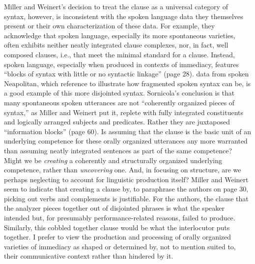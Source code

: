 Miller and Weinert’s decision to treat the clause as a universal category of syntax, however, is inconsistent with the spoken language data they themselves present or their own characterization of these data. For example, they acknowledge that spoken language, especially its more spontaneous varieties, often exhibits neither neatly integrated clause complexes, nor, in fact, well composed clauses, i.e., that meet the minimal standard for a clause. Instead, spoken language, especially when produced in contexts of immediacy, features “blocks of syntax with little or no syntactic linkage” (page 28).  data from spoken Neapolitan, which \citet{MillerWeinert1998} reference to illustrate how fragmented spoken syntax can be, is a good example of this more disjointed syntax. Sornicola’s conclusion is that many spontaneous spoken utterances are not “coherently organized pieces of syntax,” as Miller and Weinert put it, replete with fully integrated constituents and logically arranged subjects and predicates. Rather they are juxtaposed “information blocks” (page 60). Is assuming that the clause is the basic unit of an underlying competence for these orally organized utterances any more warranted than assuming neatly integrated sentences as part of the same competence? Might we be \textit{creating} a coherently and structurally organized underlying competence, rather than \textit{uncovering} one. And, in focusing on structure, are we perhaps neglecting to account for linguistic production itself? Miller and Weinert seem to indicate that creating a clause by, to paraphrase the authors on page 30, picking out verbs and complements is justifiable. For the authors, the clause that the analyzer pieces together out of disjointed phrases is what the speaker intended but, for presumably performance-related reasons, failed to produce. Similarly, this cobbled together clause would be what the interlocutor puts together. I prefer to view the production and processing of orally organized varieties of immediacy as shaped or determined by, not to mention suited to, their communicative context rather than hindered by it.\largerpage[2]

